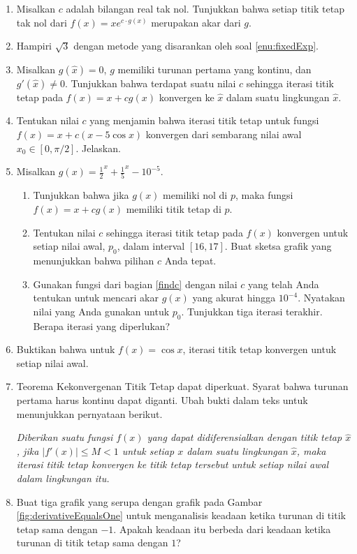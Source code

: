 \begin{enumerate}
\begin{enumerate}
\item fungsi $f$ yang Anda gunakan dalam iterasi titik tetap
\item nilai awal, $x_{0}$, yang Anda gunakan
\item jumlah iterasi yang diperlukan
\end{enumerate}
\item \label{enu:fixedExp}Misalkan $c$ adalah bilangan real tak nol. Tunjukkan
bahwa setiap titik tetap tak nol dari $f(x)=xe^{c\cdot g(x)}$ merupakan
akar dari $g$.
\item Hampiri $\sqrt{3}$ dengan metode yang disarankan oleh soal \ref{enu:fixedExp}.
\item \label{enu:findC}Misalkan $g(\hat{x})=0$, $g$ memiliki turunan
pertama yang kontinu, dan $g'(\hat{x})\neq0$. Tunjukkan bahwa terdapat
suatu nilai $c$ sehingga iterasi titik tetap pada $f(x)=x+cg(x)$
konvergen ke $\hat{x}$ dalam suatu lingkungan $\hat{x}$.
\item \label{exc:fixedpt-15}Tentukan nilai $c$ yang menjamin bahwa iterasi
titik tetap untuk fungsi $f(x)=x+c(x-5\cos x)$ konvergen dari sembarang
nilai awal $x_{0}\in[0,\pi/2]$. Jelaskan. \hasananswer 
\item Misalkan $g(x)=$$\frac{1}{2}^{x}+\frac{1}{5}^{x}-10^{-5}$. 

\begin{enumerate}
\item Tunjukkan bahwa jika $g(x)$ memiliki nol di $p$, maka fungsi $f(x)=x+cg(x)$
memiliki titik tetap di $p$.
\item \label{findc}Tentukan nilai $c$ sehingga iterasi titik tetap pada
$f(x)$ konvergen untuk setiap nilai awal, $p_{0}$, dalam interval
$[16,17]$. Buat sketsa grafik yang menunjukkan bahwa pilihan $c$
Anda tepat.
\item Gunakan fungsi dari bagian \ref{findc} dengan nilai $c$ yang telah
Anda tentukan untuk mencari akar $g(x)$ yang akurat hingga $10^{-4}$.
Nyatakan nilai yang Anda gunakan untuk $p_{0}$. Tunjukkan tiga iterasi
terakhir. Berapa iterasi yang diperlukan?
\end{enumerate}
\item Buktikan bahwa untuk $f(x)=\cos x$, iterasi titik tetap konvergen
untuk setiap nilai awal.
\item \label{enu:convergenceStrengthened}Teorema Kekonvergenan Titik Tetap
dapat diperkuat. Syarat bahwa turunan pertama harus kontinu dapat
diganti. Ubah bukti dalam teks untuk menunjukkan pernyataan berikut.

\textit{Diberikan suatu fungsi $f(x)$ yang dapat didiferensialkan
dengan titik tetap $\hat{x}$, jika $|f'(x)|\leq M<1$ untuk setiap
$x$ dalam suatu lingkungan $\hat{x}$, maka iterasi titik tetap konvergen
ke titik tetap tersebut untuk setiap nilai awal dalam lingkungan itu.}
\item Buat tiga grafik yang serupa dengan grafik pada Gambar \ref{fig:derivativeEqualsOne}
untuk menganalisis keadaan ketika turunan di titik tetap sama dengan
$-1$. Apakah keadaan itu berbeda dari keadaan ketika turunan di titik
tetap sama dengan $1$?
\end{enumerate}
\noindent\finishexercises

